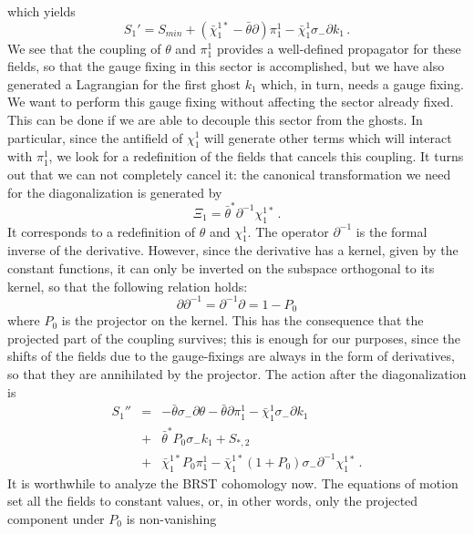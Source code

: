 \documentclass[a4paper,12pt]{article}
\begin{document}
which yields
\begin{displaymath}
  S_1' = S_{min} + (\bar\chi_1^{1*} - \bar\theta \partial) \pi_1^1 -
  \bar\chi_1^1 \sigma_- \partial k_1 \, . 
\end{displaymath}
We see that the coupling of $\theta$ and $\pi_1^1$ provides a
well-defined propagator for these fields, so that the gauge fixing in
this sector is accomplished, but we have also generated a Lagrangian
for the first ghost $k_1$ which, in turn, needs a gauge fixing. We want
to perform this gauge fixing without affecting the sector already
fixed. This can be done if we are able to
decouple this sector from the ghosts. In particular, since the antifield 
of $\chi_1^1$ will generate other terms which will interact with
$\pi_1^1$, we look for a redefinition of the fields that cancels this
coupling. It turns out that we can not completely cancel it: the
canonical transformation we need for the diagonalization is generated by  
\begin{displaymath}
  \Xi_1 = \bar\theta^* \partial^{-1} \chi_1^{1*} \, .
\end{displaymath}
It corresponds to a redefinition of $\theta$ and $\chi_1^1$. 
The operator $\partial^{-1}$ is the formal inverse of the
derivative. However, since the derivative has a kernel, given by the
constant functions, it can only be inverted on the subspace orthogonal 
to its kernel, so that the following relation holds:
\begin{displaymath}
  \partial \partial^{-1} =  \partial^{-1} \partial = 1 - P_0
\end{displaymath}
where $P_0$ is the projector on the kernel. This has the consequence
that the projected part of the coupling survives; this is enough for
our purposes, since the shifts of the fields due to the gauge-fixings
are always in the form of derivatives, so that they are annihilated by 
the projector. The action after the diagonalization is 
\begin{eqnarray*} \label{S_1''}
  S_1'' & = & - \bar\theta \sigma_- \partial \theta - \bar\theta
  \partial \pi_1^1 - \bar\chi_1^1 \sigma_- \partial k_1 \\
  & + & \bar \theta^* P_0 \sigma_- k_1 + S_{*,2} \\
  & + & \bar\chi_1^{1*} P_0 \pi_1^1 - \bar\chi_1^{1*} (1+P_0) \sigma_- 
  \partial^{-1} \chi_1^{1*} \, .
\end{eqnarray*}
It is worthwhile to analyze the BRST cohomology now.
The equations of motion set all the fields to constant values, or, in
other words, only the projected component under $P_0$ is non-vanishing
\end{document}
